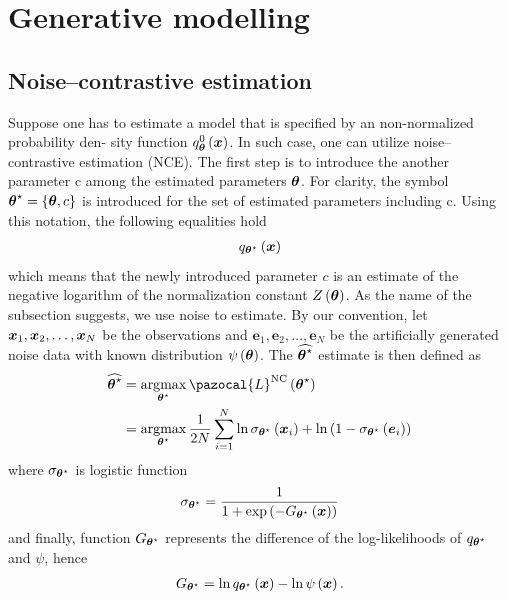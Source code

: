 \section{Generative modelling}



\subsection{Noise--contrastive estimation}
Suppose one has to estimate a model that is specified by an non-normalized probability den-
sity function $q^0_{\boldsymbol{\theta}}\left(\boldsymbol{x}\right)$. In such case, one can utilize noise--contrastive estimation (NCE). The first step is to  introduce the another parameter c among the estimated parameters $\boldsymbol{\theta}$. For clarity, the symbol $\boldsymbol{\theta}^\star=\left\lbrace\boldsymbol{\theta},c\right\rbrace$ is introduced for the set of estimated parameters including
c. Using this notation, the following equalities hold
\begin{align}
    q_{\boldsymbol{\theta}^\star}\left(\boldsymbol{x}\right)
    \end{align}
which means that the newly introduced parameter $c$ is an estimate of the negative logarithm of
the normalization constant $Z\left(\boldsymbol{\theta}\right)$.
As the name of the subsection suggests, we use noise to estimate. By our convention, let $\boldsymbol{x}_1,\boldsymbol{x}_2,\dots,\boldsymbol{x}_N$
be the observations and $\boldsymbol{e}_1,\boldsymbol{e}_2,\dots,\boldsymbol{e}_N$ be the artificially generated noise data with known distribution $\psi\left(\boldsymbol{\theta}\right)$. The $\widehat{\boldsymbol{\theta}^\star}$ estimate is then defined as
\begin{align}
    \widehat{\bt^\star} &= \argmax_{\bt^\star} \pazocal{L}^{\mathrm{NC}}\left(\bt^\star\right)\\
   &= \argmax_{\bt^\star} \frac{1}{2N}\sum_{i=1}^N \ln\sigma_{\bt^\star}\left(\bx_i\right) + \ln\left(1-\sigma_{\bt^\star}\left(\boldsymbol{e}_i\right) \right)\label{NCEloss}
\end{align}
where $\sigma_{\boldsymbol{\theta}^\star}$ is logistic function
\begin{align}
\sigma_{\boldsymbol{\theta}^\star} = \frac{1}{1 + \exp\left(-G_{\boldsymbol{\theta}^\star}\left(\boldsymbol{x}\right) \right)}
\end{align}
and finally, function $G_{\boldsymbol{\theta}^\star}$ represents the difference of the log-likelihoods of $q_{\boldsymbol{\theta}^\star}$ and $\psi$, hence
\begin{align}
    G_{\boldsymbol{\theta}^\star} = \ln q_{\boldsymbol{\theta}^\star}\left(\boldsymbol{x} \right) - \ln\psi\left(\boldsymbol{x} \right).
\end{align}
